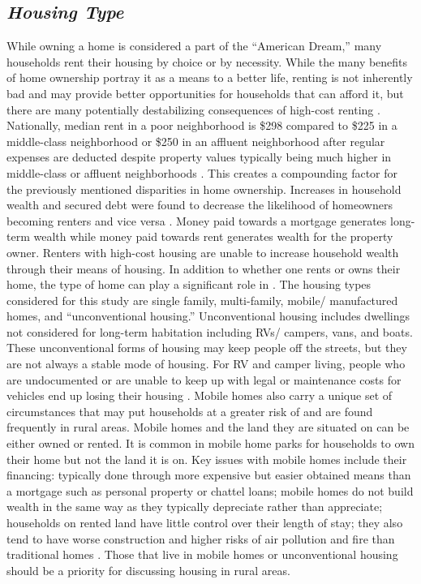 \subsection{\textit{Housing Type}} 
While owning a home is considered a part of the “American Dream,” many households rent their housing by choice or by necessity. While the many benefits of home ownership portray it as a means to a better life, renting is not inherently bad and may provide better opportunities for households that can afford it, but there are many potentially destabilizing consequences of high-cost renting \citep{drew_believing_nodate}. Nationally, median rent in a poor neighborhood is \$298 compared to \$225 in a middle-class neighborhood or \$250 in an affluent neighborhood after regular expenses are deducted despite property values typically being much higher in middle-class or affluent neighborhoods \citep{desmond_poor_2019}. This creates a compounding factor for the previously mentioned disparities in home ownership. Increases in household wealth and secured debt were found to decrease the likelihood of homeowners becoming renters and vice versa \citep{anderson_effect_2021}. Money paid towards a mortgage generates long-term wealth while money paid towards rent generates wealth for the property owner. Renters with high-cost housing are unable to increase household wealth through their means of housing.  In addition to whether one rents or owns their home, the type of home can play a significant role in \hs. The housing types considered for this study are single family, multi-family, mobile/ manufactured homes, and “unconventional housing.” Unconventional housing includes dwellings not considered for long-term habitation including RVs/ campers, vans, and boats. These unconventional forms of housing may keep people off the streets, but they are not always a stable mode of housing. For RV and camper living, people who are undocumented or are unable to keep up with legal or maintenance costs for vehicles end up losing their housing \citep{wakin_not_2005}. Mobile homes also carry a unique set of circumstances that may put households at a greater risk of \hs and are found frequently in rural areas. Mobile homes and the land they are situated on can be either owned or rented. It is common in mobile home parks for households to own their home but not the land it is on. Key issues with mobile homes include their financing: typically done through more expensive but easier obtained means than a mortgage such as personal property or chattel loans; mobile homes do not build wealth in the same way as they typically depreciate rather than appreciate; households on rented land have little control over their length of stay; they also tend to have worse construction and higher risks of air pollution and fire than traditional homes \citep{mactavish_wrong_2007}. Those that live in mobile homes or unconventional housing should be a priority for discussing housing in rural areas. 


